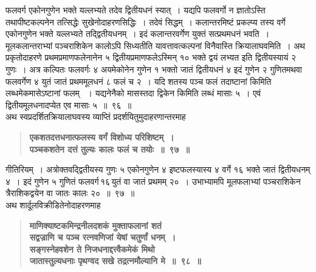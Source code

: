 \documentclass[11pt, openany]{book}
\begin{document}
\begin{sloppypar}
\noindent फलवर्ग एकोनगुणेन भक्ते यल्लभ्यते तदेव द्वितीयधनं स्यात्~। यद्यपि फलवर्गो न ज्ञातोऽस्ति तथापीष्टकल्पनेन तत्सिद्धेः सुखेनोदाहरणसिद्धिः~। तदेवं सिद्धम्~। कलान्तरमिष्टं प्रकल्प्य तस्य वर्गे एकोनगुणेन भक्ते यल्लभ्यते तद्द्वितीयधनम्~। इदं कलान्तरवर्गेण युक्तं सत्प्रथमधनं भवति~। मूलकलान्तराभ्यां पञ्चराशिकेन कालोऽपि सिध्यतीति यावत्तावत्कल्पनां विनैवास्ति क्रियालाघवमिति~। अथ प्रकृतोदाहरणे प्रथमप्रमाणफलेनानेन ५ द्वितीयप्रमाणफलेऽस्मिन् १० भक्ते द्वयं लभ्यत इति द्वितीयस्यायं २ गुणः~। अत्र कल्पितः फलवर्गः ४ अयमेकोनेन गुणेन १ भक्तो जातं द्वितीयधनं ४ इदं गुणेन २ गुणितमथवा फलवर्गेण ४ युतं जातं प्रथममूलधनं ८ फलं च २~। यदि शतस्य पञ्च फलं तदाष्टानां किमिति लब्धमेकमासेऽष्टानां फलम् ~। यद्यनेनैको मासस्तदा द्विकेन किमिति लब्धं मासाः ५~। एवं द्वितीयमूलधनादप्येत एव मासाः ५~॥~९६~॥\\

{\small अथ स्वप्रदर्शितक्रियालाघवस्य व्याप्तिं प्रदर्शयितुमुदाहरणान्तरमाह\textendash }

 \label{7.97}
\begin{quote}
{\large \textbf{{\color{purple}एकशतदत्तधनात्फलस्य वर्गं विशोध्य परिशिष्टम्~।\\
पञ्चकशतेन दत्तं तुल्यः कालः फलं च तयोः~॥~९७~॥}}}
\end{quote}

गीतिरियम्~। अत्रोक्तवद्द्वितीयस्य गुणः ५ एकोनगुणेन ४ इष्टफलस्यास्य ४ वर्गे १६ भक्ते जातं द्वितीयधनम् ४~। इदं गुणेन ५ गुणितं फलवर्ग\textendash \,१६\textendash \,युतं वा जातं प्रथमम् २०~। उभाभ्यामपि मूलफलाभ्यां पञ्चराशिकेन त्रैराशिकद्वयेन वा जातः कालः २०~॥~९७~॥\\

{\small अथ शार्दूलविक्रीडितेनोदाहरणमाह\textendash }

 \label{7.98}
\begin{quote}
{\large \textbf{{\color{purple}माणिक्याष्टकमिन्द्रनीलदशकं मुक्ताफलानां शतं\\
सद्वज्राणि च पञ्च रत्नवणिजां येषां चतुर्णां धनम्~।\\
सङ्गस्नेहवशेन ते निजधनाद्दत्त्वैकमेकं मिथो\\
जातास्तुल्यधनाः पृथग्वद सखे तद्रत्नमौल्यानि मे~॥~९८~॥}}}
\end{quote}


\end{sloppypar}
\end{document}
